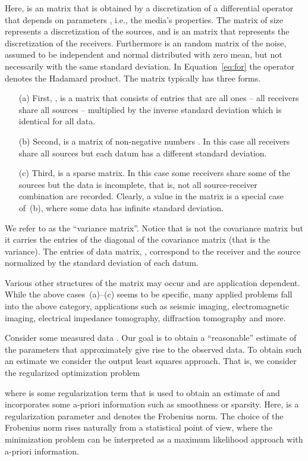 \documentclass[12pt]{article}
\begin{document}
Here,  is an  matrix that is obtained by a discretization of a differential operator that depends on parameters , i.e., the media's properties. The matrix  of size  represents a discretization of the sources, and  is an  matrix that represents the discretization of the receivers. Furthermore  is an  random matrix of the noise, assumed to be independent  and normal distributed with zero mean, but not necessarily with the same standard deviation. In Equation~\eqref{eq:for} the operator  denotes the Hadamard product. The  matrix  typically has three forms.
\begin{itemize}
\item[(a)] First, ,   is a matrix that consists of entries that are all ones -- all receivers share all sources -- multiplied by the inverse standard deviation  which is identical for all data.

\item[(b)] Second,  is a matrix of non-negative numbers . In this case all receivers share all sources but each datum has a different standard deviation.

\item[(c)] Third,  is a sparse matrix. In this case some receivers share some of the sources but the data is incomplete, that is, not all source-receiver combination are recorded. Clearly, a value 
in the matrix  is a special case of~(b), where some data has infinite standard deviation.
\end{itemize}
We refer to  as the ``variance matrix''. Notice that  is not the covariance matrix but it carries the entries of the diagonal of the covariance matrix (that is the variance). The entries of data matrix, , correspond to the  receiver and the  source normalized by the standard deviation of each datum.

Various other structures of the matrix  may occur and are application dependent.  While the above cases~(a)--(c) seems to be specific, many applied problems fall into the above category, applications such as seismic imaging, electromagnetic imaging, electrical impedance tomography, diffraction tomography \cite{smvoz,brocea,devony,na1,jc1} and more.

Consider some measured data . Our goal is to obtain a ``reasonable'' estimate of the parameters  that approximately give rise to the observed data. To obtain such an estimate we consider the output least squares approach. That is, we consider the regularized optimization problem

where  is some regularization term that is used to obtain an estimate of  and incorporates some a-priori information such as smoothness or sparsity. Here,  is a regularization parameter and  denotes the Frobenius norm. The choice of the Frobenius norm rises naturally from a statistical point of view, where the minimization problem can be interpreted as a maximum likelihood approach with a-priori information.
\end{document}
